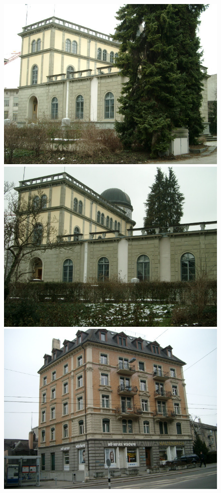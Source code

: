 \documentclass[10pt,conference,a4paper]{IEEEtran}
\begin{document}
\begin{figure}
			\resizebox{1.975\columnwidth}{!}
			{
				\includegraphics[scale=0.123]{zubud1.jpg}
				\includegraphics[scale=0.123]{zubud2.jpg}
				\includegraphics[scale=0.123]{zubud3.jpg}
}
\end{figure}
\end{document}
